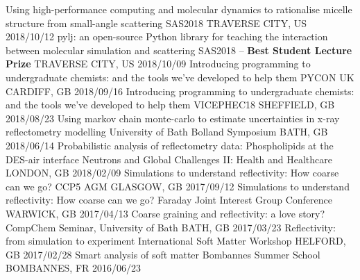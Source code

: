 \begin{cvhonors}
  \cvhonor
    {Using high-performance computing and molecular dynamics to rationalise micelle structure from small-angle scattering}
    {SAS2018}
    {TRAVERSE CITY, US}
    {2018/10/12}
  \cvhonor
    {pylj: an open-source Python library for teaching the interaction between molecular simulation and scattering}
	{SAS2018 -- \textbf{Best Student Lecture Prize}}
    {TRAVERSE CITY, US}
    {2018/10/09}
  \cvhonor
    {Introducing programming to undergraduate chemists: and the tools we've developed to help them}
    {PYCON UK}
    {CARDIFF, GB}
    {2018/09/16}
  \cvhonor
    {Introducing programming to undergraduate chemists: and the tools we've developed to help them}
    {VICEPHEC18}
    {SHEFFIELD, GB}
    {2018/08/23}
  \cvhonor
    {Using markov chain monte-carlo to estimate uncertainties in x-ray reflectometry modelling}
    {University of Bath Bolland Symposium}
    {BATH, GB}
    {2018/06/14}
  \cvhonor
    {Probabilistic analysis of reflectometry data: Phospholipids at the DES-air interface}
    {Neutrons and Global Challenges II: Health and Healthcare}
    {LONDON, GB}
    {2018/02/09}
  \cvhonor
    {Simulations to understand reflectivity: How coarse can we go?}
    {CCP5 AGM}
    {GLASGOW, GB}
    {2017/09/12}
  \cvhonor
    {Simulations to understand reflectivity: How coarse can we go?}
    {Faraday Joint Interest Group Conference}
    {WARWICK, GB}
    {2017/04/13}
  \cvhonor
    {Coarse graining and reflectivity: a love story?}
    {CompChem Seminar, University of Bath}
    {BATH, GB}
    {2017/03/23}
  \cvhonor
    {Reflectivity: from simulation to experiment}
    {International Soft Matter Workshop}
    {HELFORD, GB}
    {2017/02/28}
  \cvhonor
    {Smart analysis of soft matter}
    {Bombannes Summer School}
    {BOMBANNES, FR}
    {2016/06/23}
\end{cvhonors}
